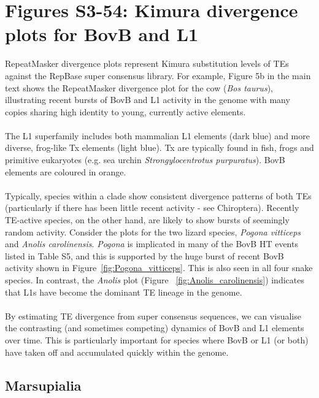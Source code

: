 \documentclass[12pt,a4paper,times]{article}
\begin{document}
\section*{Figures S3-54: Kimura divergence plots for BovB and L1}
RepeatMasker divergence plots represent Kimura substitution levels of TEs against the RepBase super consensus library. 
For example, Figure 5b in the main text shows the RepeatMasker divergence plot for the cow (\textit{Bos taurus}), illustrating recent bursts of BovB and L1 activity in the genome with many copies sharing high identity to young, currently active elements.
\\ \\
The L1 superfamily includes both mammalian L1 elements (dark blue) and more diverse, frog-like Tx elements (light blue). 
Tx are typically found in fish, frogs and primitive eukaryotes (e.g. sea urchin \textit{Strongylocentrotus purpuratus}). 
BovB elements are coloured in orange.
\\ \\
Typically, species within a clade show consistent divergence patterns of both TEs (particularly if there has been little recent activity - see Chiroptera). 
Recently TE-active species, on the other hand, are likely to show bursts of seemingly random activity. Consider the plots for the two lizard species, \textit{Pogona vitticeps} and \textit{Anolis carolinensis}. \textit{Pogona} is implicated in many of the BovB HT events listed in Table S5, and this is supported by the huge burst of recent BovB activity shown in Figure~\ref{fig:Pogona_vitticeps}. This is also seen in all four snake species. In contrast, the \textit{Anolis} plot (Figure ~\ref{fig:Anolis_carolinensis}) indicates that L1s have become the dominant TE lineage in the genome. 
\\ \\
By estimating TE divergence from super consensus sequences, we can visualise the contrasting (and sometimes competing) dynamics of BovB and L1 elements over time. This is particularly important for species where BovB or L1 (or both) have taken off and accumulated quickly within the genome.

\subsection*{Marsupialia}
\end{document}
